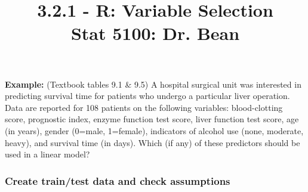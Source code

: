 \documentclass{article}\usepackage[]{graphicx}\usepackage[]{color}
\begin{document}
\title{%
  3.2.1 - R: Variable Selection \\
  \smallskip
  \large Stat 5100: Dr. Bean
}
\date{}

\maketitle

\textbf{Example:} (Textbook tables 9.1 \& 9.5)  A hospital surgical unit was interested in predicting survival time for patients who undergo a particular liver operation.  Data are reported for 108 patients on the following variables:  blood-clotting score, prognostic index, enzyme function test score, liver function test score, age (in years), gender (0=male, 1=female), indicators of alcohol use (none, moderate, heavy), and survival time (in days).  Which (if any) of these predictors should be used in a linear model?

\subsubsection*{Create train/test data and check assumptions}
\end{document}
